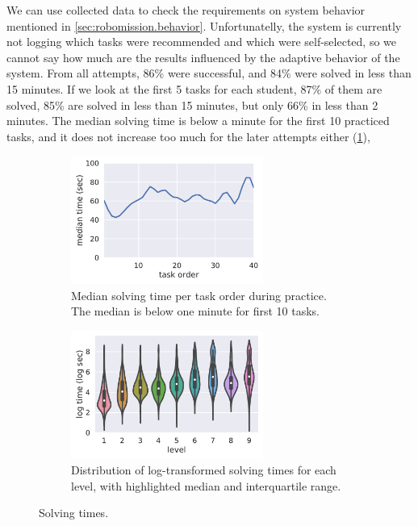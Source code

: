 We can use collected data to check the requirements on system behavior mentioned in
\cref{sec:robomission.behavior}. Unfortunatelly, the system is currently not logging
which tasks were recommended and which were self-selected, so we cannot say
how much are the results influenced by the adaptive behavior of the system.
From all attempts, 86\% were successful, and 84\% were solved in less than 15 minutes.
If we look at the first 5 tasks for each student, 87\% of them are solved,
85\% are solved in less than 15 minutes, but only 66\% in less than 2 minutes.
The median solving time is below a minute for the first 10 practiced tasks,
and it does not increase too much for the later attempts either (\cref{fig:solving-times}),

\begin{figure}[htb]
\centering
\begin{subfigure}{.48\textwidth}
\centering
\includegraphics[height=42mm]{img/median-time-order}
\caption{Median solving time per task order during practice.
  The median is below one minute for first 10 tasks.}
\end{subfigure}
\begin{subfigure}{.51\textwidth}
\centering
\includegraphics[height=42mm]{img/levels-time}
\caption{Distribution of log-transformed solving times for each level,
         with highlighted median and interquartile range.}
\end{subfigure}
\caption{Solving times.}
\label{fig:solving-times}
\end{figure}


